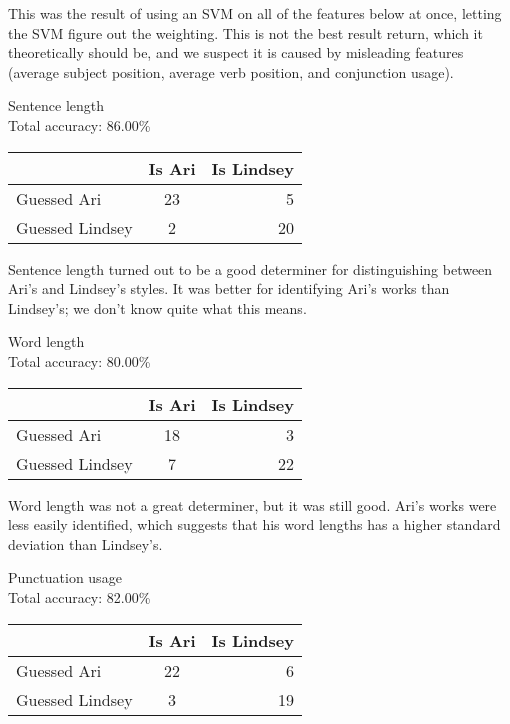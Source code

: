 \documentclass[twocolumn]{article}
\begin{document}
  This was the result of using an SVM on all of the features below at once, letting the SVM figure out the weighting. This is not the best result return, which it theoretically should be, and we suspect it is caused by misleading features (average subject position, average verb position, and conjunction usage).
  
  \begin{center}
    Sentence length \\
    Total accuracy: 86.00\%
    \begin{tabular}{ l || c | r }
      \hline
      & Is Ari & Is Lindsey \\ \hline
      Guessed Ari & 23 & 5 \\ \hline
      Guessed Lindsey & 2 & 20 \\
      \hline
    \end{tabular}
  \end{center}
  
  Sentence length turned out to be a good determiner for distinguishing between Ari's and Lindsey's styles. It was better for identifying Ari's works than Lindsey's; we don't know quite what this means.
  
  \begin{center}
    Word length \\
    Total accuracy: 80.00\%
    \begin{tabular}{ l || c | r }
      \hline
      & Is Ari & Is Lindsey \\ \hline
      Guessed Ari & 18 & 3 \\ \hline
      Guessed Lindsey & 7 & 22 \\
      \hline
    \end{tabular}
  \end{center}
  
  Word length was not a great determiner, but it was still good. Ari's works were less easily identified, which suggests that his word lengths has a higher standard deviation than Lindsey's.
  
  \begin{center}
    Punctuation usage \\
    Total accuracy: 82.00\%
    \begin{tabular}{ l || c | r }
      \hline
      & Is Ari & Is Lindsey \\ \hline
      Guessed Ari & 22 & 6 \\ \hline
      Guessed Lindsey & 3 & 19 \\
      \hline
    \end{tabular}
  \end{center}
  
\end{document}
